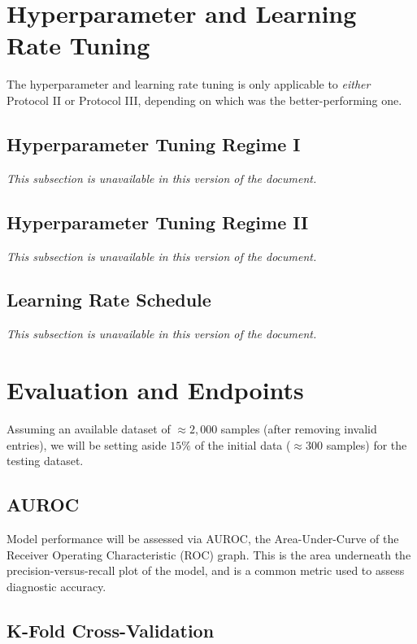\section{Hyperparameter and Learning Rate Tuning}

The hyperparameter and learning rate tuning is only applicable to \emph{either} Protocol II or Protocol III, depending on which was the better-performing one.

\subsection{Hyperparameter Tuning Regime I}

\emph{This subsection is unavailable in this version of the document.}

\subsection{Hyperparameter Tuning Regime II}

\emph{This subsection is unavailable in this version of the document.}

\subsection{Learning Rate Schedule}

\emph{This subsection is unavailable in this version of the document.}

\section{Evaluation and Endpoints}

Assuming an available dataset of \(\approx2,000\) samples (after removing invalid entries), we will be setting aside \(15\%\) of the initial data (\(\approx300\) samples) for the testing dataset.

\subsection{AUROC}

Model performance will be assessed via AUROC, the Area-Under-Curve of the Receiver Operating Characteristic (ROC) graph. This is the area underneath the precision-versus-recall plot of the model, and is a common metric used to assess diagnostic accuracy.

\subsection{K-Fold Cross-Validation}

